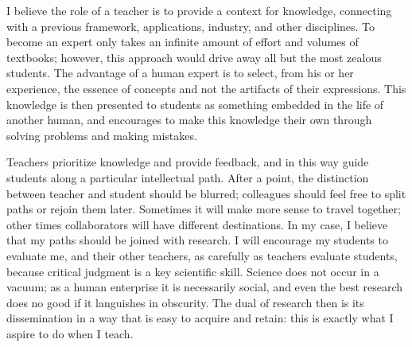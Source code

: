 \documentclass{article}
\begin{document}
I believe the role of a teacher is to provide a context for knowledge,
connecting with a previous framework, applications, industry, and other
disciplines. To become an expert only takes an infinite amount of effort and
volumes of textbooks; however, this approach would drive away all but the
most zealous students. The advantage of a human expert is to select, from
his or her experience, the essence of concepts and not the artifacts of their
expressions.
This knowledge is then presented to students as something
embedded in the life of another human, and encourages to make this knowledge
their own through solving problems and making mistakes.

Teachers prioritize knowledge and provide feedback, and in this
way guide students along a particular intellectual path. After a point,
the distinction between teacher and student should be blurred; colleagues
should feel free to split paths or rejoin them later. Sometimes it will
make more sense to travel together; other times collaborators will have
different destinations.
 In my case, I
believe that my paths should be joined with research. I will
encourage my students to evaluate me, and their other teachers,
as carefully as teachers evaluate students,
because critical judgment is a key scientific skill.
Science does not occur in a vacuum; as a human enterprise
it is necessarily social, and even the best research does no good if it
languishes in obscurity. The dual of research then is its dissemination
in a way that is easy to acquire and retain: this is exactly what I
aspire to do when I teach.
\end{document}
